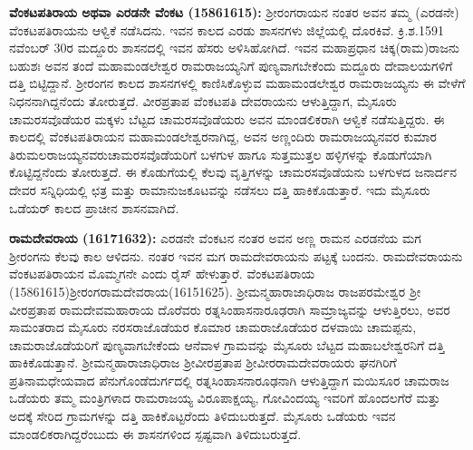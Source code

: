 \textbf{ವೆಂಕಟಪತಿರಾಯ ಅಥವಾ ಎರಡನೇ ವೆಂಕಟ (15861615): } ಶ‍್ರೀರಂಗರಾಯನ ನಂತರ ಅವನ ತಮ್ಮ (ಎರಡನೇ) ವೆಂಕಟಪತಿರಾಯನು ಆಳ್ವಿಕೆ ನಡೆಸಿದನು. ಇವನ ಕಾಲದ ಎರಡು ಶಾಸನಗಳು ಜಿಲ್ಲೆಯಲ್ಲಿ ದೊರಕಿವೆ. ಕ್ರಿ.ಶ.1591 ನವೆಂಬರ್​ 30ರ ಮದ್ದೂರು ಶಾಸನದಲ್ಲಿ ಇವನ ಹೆಸರು ಅಳಿಸಿಹೋಗಿದೆ. ಇವನ ಮಹಾಪ್ರಧಾನ ಚಿಕ್ಕ(ರಾಮ)ರಾಜನು ಬಹುಶಃ ಅವನ ತಂದೆ ಮಹಾಮಂಡಲೇಶ್ವರ ರಾಮರಾಜಯ್ಯನಿಗೆ ಪುಣ್ಯವಾಗಬೇಕೆಂದು ಮದ್ದೂರು ದೇವಾಲಯಗಳಿಗೆ ದತ್ತಿ ಬಿಟ್ಟಿದ್ದಾನೆ. ಶ‍್ರೀರಂಗನ ಕಾಲದ ಶಾಸನಗಳಲ್ಲಿ ಕಾಣಿಸಿಕೊಳ್ಳುವ ಮಹಾಮಂಡಲೇಶ್ವರ ರಾಮರಾಜಯ್ಯನು ಈ ವೇಳೆಗೆ ನಿಧನನಾಗಿದ್ದನೆಂದು ತೋರುತ್ತದೆ. ವೀರಪ್ರತಾಪ ವೆಂಕಟಪತಿ ದೇವರಾಯನು ಆಳುತ್ತಿದ್ದಾಗ, ಮೈಸೂರು ಚಾಮರಸವೊಡೆಯರ ಮಕ್ಕಳು ಬೆಟ್ಟದ ಚಾಮರಸವೊಡೆಯರು ಅವನ ಮಾಂಡಲಿಕರಾಗಿ ಆಳ್ವಿಕೆ ನಡೆಸುತ್ತಿದ್ದರು. ಈ ಕಾಲದಲ್ಲಿ ವೆಂಕಟಪತಿರಾಯನ ಮಹಾಮಂಡಲೇಶ್ವರನಾಗಿದ್ದ, ಅವನ ಅಣ್ಣಂದಿರು ರಾಮರಾಜಯ್ಯನವರ ಕುಮಾರ ತಿರುಮಲರಾಜಯ್ಯನವರು\break ಚಾಮರಸವೊಡೆಯರಿಗೆ ಬಳಗುಳ ಹಾಗೂ ಸುತ್ತಮುತ್ತಲ ಹಳ್ಳಿಗಳನ್ನು ಕೊಡುಗೆಯಾಗಿ ಕೊಟ್ಟಿದ್ದನೆಂದು ತೋರುತ್ತದೆ. ಈ ಕೊಡುಗೆಯಲ್ಲಿ ಕೆಲವು ವೃತ್ತಿಗಳನ್ನು ಚಾಮರಸವೊಡೆಯನು ಬಳಗುಳದ ಜನಾರ್ದನ ದೇವರ ಸನ್ನಿಧಿಯಲ್ಲಿ ಛತ್ರ ಮತ್ತು ರಾಮಾನುಜಕೂಟವನ್ನು ನಡೆಸಲು ದತ್ತಿ ಹಾಕಿಕೊಡುತ್ತಾರೆ. ಇದು ಮೈಸೂರು ಒಡೆಯರ್ ಕಾಲದ ಪ್ರಾಚೀನ ಶಾಸನವಾಗಿದೆ.

\textbf{ರಾಮದೇವರಾಯ (16171632): } ಎರಡನೇ ವೆಂಕಟನ ನಂತರ ಅವನ ಅಣ್ಣ ರಾಮನ ಎರಡನೆಯ ಮಗ ಶ‍್ರೀರಂಗನು ಕೆಲವು ಕಾಲ ಆಳಿದನು. ನಂತರ ಇವನ ಮಗ ರಾಮದೇವರಾಯನು ಪಟ್ಟಕ್ಕೆ ಬಂದನು. ರಾಮದೇವರಾಯನು ವೆಂಕಟಪತಿರಾಯನ ಮೊಮ್ಮಗನೇ ಎಂದು ರೈಸ್​ ಹೇಳುತ್ತಾರೆ. ವೆಂಕಟಪತಿರಾಯ (15861615)ಶ‍್ರೀರಂಗರಾಮದೇವರಾಯ\break (16151625). ಶ‍್ರೀಮನ್ಮಹಾರಾಜಾಧಿರಾಜ ರಾಜಪರಮೇಶ್ವರ ಶ‍್ರೀ ವೀರಪ್ರತಾಪ ರಾಮದೇವಮಹಾರಾಯ ದೊರೆವರು ರತ್ನಸಿಂಹಾಸನಾರೂಢರಾಗಿ ಸಾಮ್ರಾಜ್ಯವನ್ನು ಆಳುತ್ತಿರಲು, ಅವರ ಸಾಮಂತರಾದ ಮೈಸೂರು ನರಸರಾಜೊಡೆಯರ ಕೊಮಾರ ಚಾಮರಾಜೊಡೆಯರ ದಳವಾಯಿ ಚಾಮಪ್ಪನು, ಚಾಮರಾಜೊಡೆಯರಿಗೆ ಪುಣ್ಯವಾಗಬೇಕೆಂದು ಆನೆವಾಳ ಗ್ರಾಮ\-ವನ್ನು ಮೈಸೂರು ಬೆಟ್ಟದ ಮಹಾಬಲೇಶ್ವರನಿಗೆ ದತ್ತಿ ಹಾಕಿಕೊಡುತ್ತಾನೆ. ಶ‍್ರೀಮನ್ಮಹಾರಾಜಾಧಿರಾಜ ಶ‍್ರೀವೀರಪ್ರತಾಪ ಶ‍್ರೀವೀರರಾಮದೇವರಾಯರು ಘನಗಿರಿಗೆ ಪ್ರತಿನಾಮಧೇಯವಾದ ಪೆನುಗೊಂಡೆದುರ್ಗದಲ್ಲಿ ರತ್ನಸಿಂಹಾಸನಾರೂಢನಾಗಿ ಆಳುತ್ತಿದ್ದಾಗ ಮಯಿಸೂರ ಚಾಮರಾಜ ಒಡೆಯರು ತಮ್ಮ ಮಂತ್ರಿಗಳಾದ ರಾಮರಾಜಯ್ಯ ವಿರೂಪಾಕ್ಷಯ್ಯ, ಗೋವಿಂದಯ್ಯ ಇವರಿಗೆ ಹೊಂದಲಗೆರೆ ಮತ್ತು ಅದಕ್ಕೆ ಸೇರಿದ ಗ್ರಾಮಗಳನ್ನು ದತ್ತಿ ಹಾಕಿಕೊಟ್ಟರೆಂದು ತಿಳಿದುಬರುತ್ತದೆ. ಮೈಸೂರು ಒಡೆಯರು ಇವನ ಮಾಂಡಲಿಕರಾಗಿದ್ದರೆಂಬುದು ಈ ಶಾಸನಗಳಿಂದ ಸ್ಪಷ್ಟವಾಗಿ ತಿಳಿದುಬರುತ್ತದೆ. 

